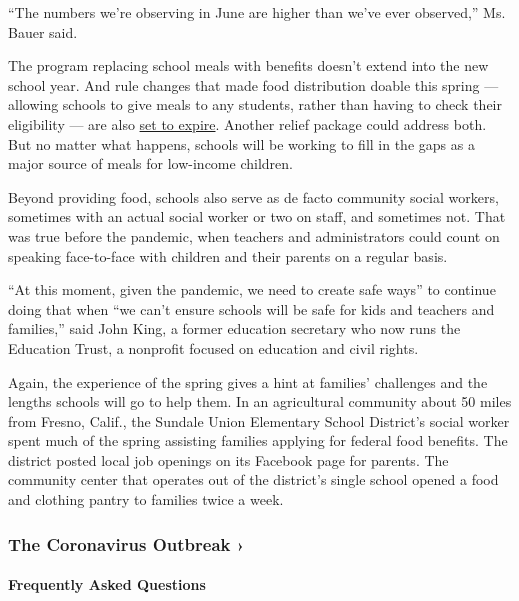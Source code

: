 ``The numbers we're observing in June are higher than we've ever
observed,'' Ms. Bauer said.

The program replacing school meals with benefits doesn't extend into the
new school year. And rule changes that made food distribution doable
this spring --- allowing schools to give meals to any students, rather
than having to check their eligibility --- are also
\href{https://www.politico.com/news/2020/07/20/millions-of-kids-may-lose-out-on-free-meals-as-they-return-to-school-374587}{set
to expire}. Another relief package could address both. But no matter
what happens, schools will be working to fill in the gaps as a major
source of meals for low-income children.

Beyond providing food, schools also serve as de facto community social
workers, sometimes with an actual social worker or two on staff, and
sometimes not. That was true before the pandemic, when teachers and
administrators could count on speaking face-to-face with children and
their parents on a regular basis.

``At this moment, given the pandemic, we need to create safe ways'' to
continue doing that when ``we can't ensure schools will be safe for kids
and teachers and families,'' said John King, a former education
secretary who now runs the Education Trust, a nonprofit focused on
education and civil rights.

Again, the experience of the spring gives a hint at families' challenges
and the lengths schools will go to help them. In an agricultural
community about 50 miles from Fresno, Calif., the Sundale Union
Elementary School District's social worker spent much of the spring
assisting families applying for federal food benefits. The district
posted local job openings on its Facebook page for parents. The
community center that operates out of the district's single school
opened a food and clothing pantry to families twice a week.

\href{https://www.nytimes.com/news-event/coronavirus?action=click\&pgtype=Article\&state=default\&region=MAIN_CONTENT_3\&context=storylines_faq}{}

\hypertarget{the-coronavirus-outbreak-}{%
\subsubsection{The Coronavirus Outbreak
›}\label{the-coronavirus-outbreak-}}

\hypertarget{frequently-asked-questions}{%
\paragraph{Frequently Asked
Questions}\label{frequently-asked-questions}}

